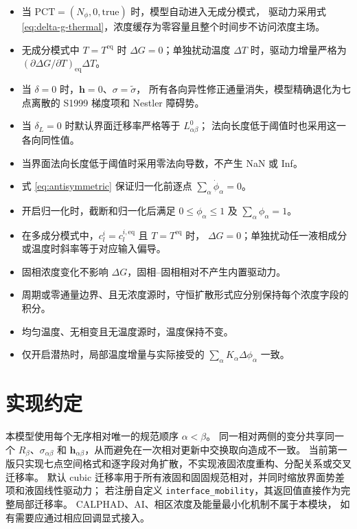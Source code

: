 \documentclass[UTF8,a4paper,11pt]{ctexart}
\newcommand{\vct}[1]{\bm{#1}}
\begin{document}
\begin{itemize}
  \item 当 \(\mathrm{PCT}=(N_\phi,0,\mathrm{true})\) 时，模型自动进入无成分模式，
        驱动力采用式 \eqref{eq:delta-g-thermal}，浓度缓存为零容量且整个时间步不访问浓度主场。
  \item 无成分模式中 \(T=T^{\mathrm{eq}}\) 时 \(\Delta G=0\)；单独扰动温度
        \(\Delta T\) 时，驱动力增量严格为
        \((\partial\Delta G/\partial T)_{\mathrm{eq}}\Delta T\)。
  \item 当 \(\delta=0\) 时，\(\vct h=0\)、\(\sigma=\widetilde\sigma\)，
        所有各向异性修正通量消失，模型精确退化为七点离散的
        S1999 梯度项和 Nestler 障碍势。
  \item 当 \(\delta_L=0\) 时默认界面迁移率严格等于 \(L^0_{\alpha\beta}\)；
        法向长度低于阈值时也采用这一各向同性值。
  \item 当界面法向长度低于阈值时采用零法向导数，不产生 NaN 或 Inf。
  \item 式 \eqref{eq:antisymmetric} 保证归一化前逐点
        \(\sum_\alpha\dot\phi_\alpha=0\)。
  \item 开启归一化时，截断和归一化后满足
        \(0\leq\phi_\alpha\leq1\) 及 \(\sum_\alpha\phi_\alpha=1\)。
  \item 在多成分模式中，\(c_l^i=c_l^{i,\mathrm{eq}}\) 且 \(T=T^{\mathrm{eq}}\) 时，
        \(\Delta G=0\)；单独扰动任一液相成分或温度时斜率等于对应输入偏导。
  \item 固相浓度变化不影响 \(\Delta G\)，固相--固相相对不产生内置驱动力。
  \item 周期或零通量边界、且无浓度源时，守恒扩散形式应分别保持每个浓度字段的积分。
  \item 均匀温度、无相变且无温度源时，温度保持不变。
  \item 仅开启潜热时，局部温度增量与实际接受的
        \(\sum_\alpha K_\alpha\Delta\phi_\alpha\) 一致。
\end{itemize}

\section{实现约定}

本模型使用每个无序相对唯一的规范顺序 \(\alpha<\beta\)。
同一相对两侧的变分共享同一个 \(R_\beta\)、\(\sigma_{\alpha\beta}\) 和
\(\vct h_{\alpha\beta}\)，从而避免在一次相对更新中交换取向造成不一致。
当前第一版只实现七点空间格式和逐字段对角扩散，不实现液固浓度重构、分配关系或交叉迁移率。
默认 cubic 迁移率用于所有液固和固固规范相对，并同时缩放界面势差项和液固线性驱动力；
若注册自定义 \texttt{interface\_mobility}，其返回值直接作为完整局部迁移率。
CALPHAD、AI、相区浓度及能量最小化机制不属于本模块，
如有需要应通过相应回调显式接入。
\end{document}
